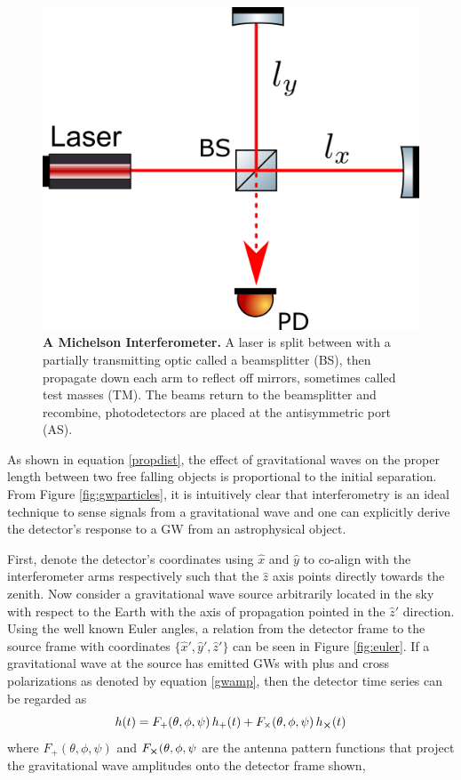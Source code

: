 	\begin{figure}[ht]
		\centering
		\includegraphics[width=.45 \textwidth]{../Figures/SimpleMichelson.png}
		\caption[A Michelson Interferometer.]  
		{\textbf{A Michelson Interferometer.} A laser is split between with a partially transmitting optic called a beamsplitter (BS), then propagate down each arm to reflect off mirrors, sometimes called test masses (TM).  The beams return to the beamsplitter and recombine, photodetectors are placed at the antisymmetric port (AS).   }
		\label{fig:simple_michelson}
	\end{figure}
	As shown in equation \ref{propdist}, the effect of gravitational waves on the proper length between two free falling objects is proportional to the initial separation.  From Figure \ref{fig:gwparticles}, it is intuitively clear that interferometry is an ideal technique to sense signals from a gravitational wave and one can explicitly derive the detector's response to a GW from an astrophysical object.
	
	First, denote the detector's coordinates using $\hat{x}$ and $\hat{y}$ to co-align with the interferometer arms respectively such that the $\hat{z}$ axis points directly towards the zenith. Now consider a gravitational wave source arbitrarily located in the sky with respect to the Earth with the axis of propagation pointed in the $\hat{z}'$ direction.  Using the well known Euler angles, a relation from the detector frame to the source frame with coordinates $\{\hat{x}',\hat{y}',\hat{z}'\}$ can be seen in Figure \ref{fig:euler}.  If a gravitational wave at the source has emitted GWs with plus and cross polarizations as denoted by equation \ref{gwamp}, then the detector time series can be regarded as \cite{S6sensitivity} \cite{Finn:1995}
	\begin{equation}
	h(t) = F_{+}(\theta,\phi,\psi) \, h_{+}(t) + F_{\times}(\theta,\phi,\psi) \, h_{\cross}(t)
	\end{equation}
	where $F_{+}(\theta,\phi,\psi)$ and $F_{\cross}(\theta,\phi,\psi$ are the antenna pattern functions that project the gravitational wave amplitudes onto the detector frame shown,
	
